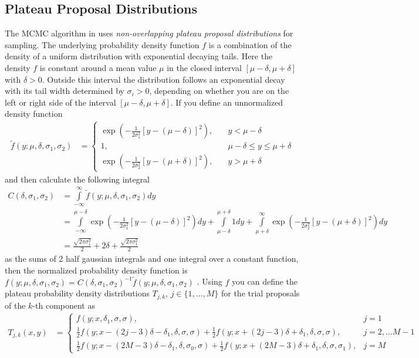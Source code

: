 \documentclass{scrartcl}
\begin{document}
	\subsection{Plateau Proposal Distributions}
    The MCMC algorithm in \cite{lau2019} uses \textit{non-overlapping plateau proposal distributions} for sampling.
	The underlying probability density function $f$ is a combination of the density of a uniform distribution
	with exponential decaying tails. Here the density $f$ is constant around a mean value $\mu$ in the closed interval $[\mu-\delta,\mu+\delta]$ with $\delta > 0$.
	Outside this interval the distribution follows an exponential decay with its tail width determined by $\sigma_i > 0$,
	depending on whether you are on the left or right side of the interval $[\mu-\delta,\mu+\delta]$. If you define
	an unnormalized density function
	\begin{align*}
		\tilde{f}(y;\mu,\delta,\sigma_1,\sigma_2)&=\begin{cases}
			\exp\left( -\frac{1}{2\sigma_1^2}[y-(\mu-\delta)]^2 \right),&\quad y<\mu-\delta\\
           1,&\quad\mu-\delta\leq y\leq\mu+\delta\\
           \exp\left( -\frac{1}{2\sigma_2^2}[y-(\mu+\delta)]^2 \right),&\quad y>\mu+\delta
		\end{cases}
	\end{align*}
    and then calculate the following integral
    \begin{align*}
        C(\delta,\sigma_1,\sigma_2)&=\int\limits_{-\infty}^\infty\tilde{f}(y;\mu,\delta,\sigma_1,\sigma_2) dy\\
        &= \int\limits_{-\infty}^{\mu-\delta}\exp\left( -\frac{1}{2\sigma_1^2}[y-(\mu-\delta)]^2 \right)dy+
        \int\limits_{\mu-\delta}^{\mu+\delta}1dy+
        \int\limits_{\mu+\delta}^{\infty}\exp\left( -\frac{1}{2\sigma_2^2}[y-(\mu+\delta)]^2 \right)dy\\
        &=\frac{\sqrt{2\pi\sigma_1^2}}{2}+2\delta+\frac{\sqrt{2\pi\sigma_1^2}}{2}
    \end{align*}
    as the sums of 2 half gaussian integrals and one integral over a constant function, then the normalized probability density function is $f(y; \mu,\delta,\sigma_1,\sigma_2)=C(\delta,\sigma_1,\sigma_2)^{-1}\tilde{f}(y;\mu,\delta,\sigma_1,\sigma_2)$ \cite{lau2019}.
    Using $f$ you can define the plateau probability density distributions $T_{j,k}$, $j\in\{1,\dots,M\}$ for the trial proposals of the $k$-th component as
    \begin{align*}
        T_{j,k}(x,y)&=\begin{cases}
                          f(y;x,\delta_1,\sigma,\sigma),&j=1\\
                          \frac 12 f(y;x-(2j-3)\delta-\delta_1,\delta,\sigma,\sigma)+\frac 12 f(y;x+(2j-3)\delta+\delta_1,\delta,\sigma,\sigma),&j=2,\dots M-1\\
                          \frac 12 f(y;x-(2M-3)\delta-\delta_1,\delta,\sigma_0,\sigma)+\frac 12 f(y;x+(2M-3)\delta+\delta_1,\delta,\sigma,\sigma_1),&j=M
        \end{cases}
    \end{align*}
\end{document}
